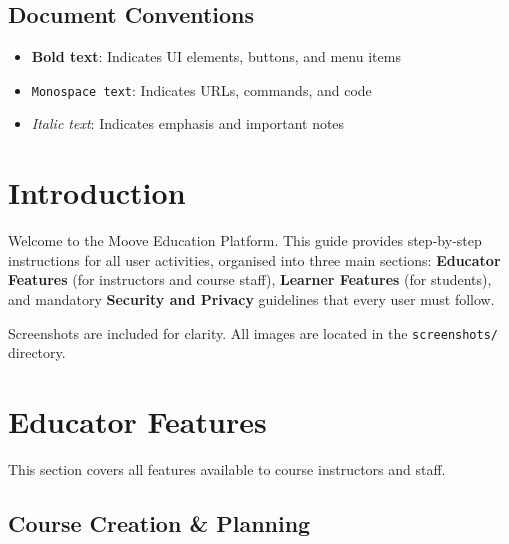 \subsection{Document Conventions}
\begin{itemize}
    \item \textbf{Bold text}: Indicates UI elements, buttons, and menu items
    \item \texttt{Monospace text}: Indicates URLs, commands, and code
    \item \textit{Italic text}: Indicates emphasis and important notes
\end{itemize}

\newpage
\section{Introduction}
Welcome to the Moove Education Platform. This guide provides step‑by‑step instructions for all user activities, organised into three main sections: \textbf{Educator Features} (for instructors and course staff), \textbf{Learner Features} (for students), and mandatory \textbf{Security and Privacy} guidelines that every user must follow.

Screenshots are included for clarity. All images are located in the \texttt{screenshots/} directory.

\section{Educator Features}
This section covers all features available to course instructors and staff.

\subsection{Course Creation \& Planning}

